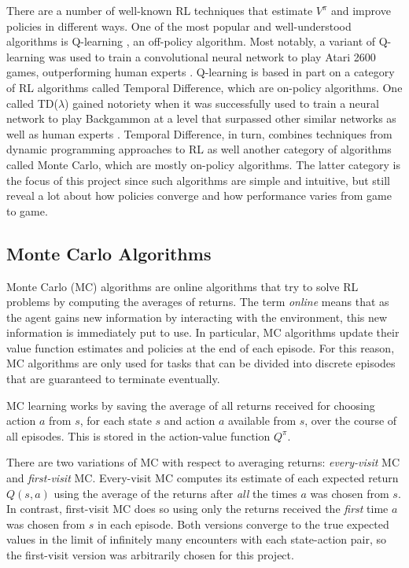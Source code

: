 \documentclass[11pt,a4paper]{report}
\begin{document}
There are a number of well-known RL techniques that estimate $V^{\pi}$ and improve policies in different ways. One of the most popular and well-understood \cite{challenges-of-rl} algorithms is Q-learning \cite{q-learning}, an off-policy algorithm. Most notably, a variant of Q-learning was used to train a convolutional neural network to play Atari 2600 games, outperforming human experts \cite{atari}. Q-learning is based in part on a category of RL algorithms called Temporal Difference, which are on-policy algorithms. One called TD($\lambda$) gained notoriety when it was successfully used to train a neural network to play Backgammon at a level that surpassed other similar networks as well as human experts \cite{backgammon}. Temporal Difference, in turn, combines techniques from dynamic programming approaches to RL as well another category of algorithms called Monte Carlo, which are mostly on-policy algorithms. The latter category is the focus of this project since such algorithms are simple and intuitive, but still reveal a lot about how policies converge and how performance varies from game to game.


\subsection{Monte Carlo Algorithms}
\label{sec:MonteCarloAlgorithms}

Monte Carlo (MC) algorithms are online algorithms that try to solve RL problems by computing the averages of returns. The term \emph{online} means that as the agent gains new information by interacting with the environment, this new information is immediately put to use. In particular, MC algorithms update their value function estimates and policies at the end of each episode. For this reason, MC algorithms are only used for tasks that can be divided into discrete episodes that are guaranteed to terminate eventually.

MC learning works by saving the average of all returns received for choosing action $a$ from $s$, for each state $s$ and action $a$ available from $s$, over the course of all episodes. This is stored in the action-value function $Q^{\pi}$.

There are two variations of MC with respect to averaging returns: \emph{every-visit} MC and \emph{first-visit} MC. Every-visit MC computes its estimate of each expected return $Q(s,a)$ using the average of the returns after \emph{all} the times $a$ was chosen from $s$. In contrast, first-visit MC does so using only the returns received the \emph{first} time $a$ was chosen from $s$ in each episode. Both versions converge to the true expected values in the limit of infinitely many encounters with each state-action pair, so the first-visit version was arbitrarily chosen for this project.
\end{document}
